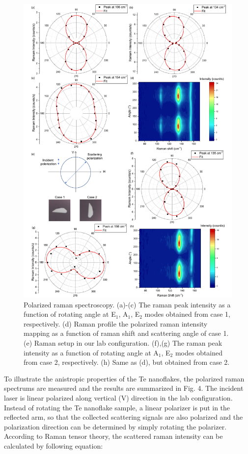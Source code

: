\documentclass[journal=jacsat,manuscript=article]{achemso}
\begin{document}
\begin{figure}
  \centering
  \includegraphics[width=13cm]{PR1.pdf}
  \caption{Polarized raman spectroscopy. (a)-(c) The raman peak intensity as a function of rotating angle at E$_1$, A$_1$, E$_2$ modes obtained from case 1, respectively. (d) Raman profile the polarized raman intensity mapping as a function of raman shift and scattering angle of case 1. (e) Raman setup in our lab configuration. (f),(g) The raman peak intensity as a function of rotating angle at A$_1$, E$_2$ modes obtained from case 2, respectively. (h) Same as (d), but obtained from case 2.}
    \label{fig:PR}
\end{figure}

To illustrate the anistropic properties of the Te nanoflakes, the polarized raman spectrums are measured and the results are summarized in Fig. 4. The incident laser is linear polarized along vertical (V) direction in the lab configuration. Instead of rotating the Te nanoflake sample, a linear polarizer is put in the reflected arm, so that the collected scattering signals are also polarized and the polarization direction can be determined  by simply rotating the polarizer. According to Raman tensor theory, the scattered raman intensity can be calculated by following equation\cite{kranert2016raman}:
\end{document}
